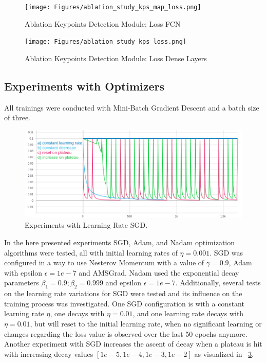 \begin{figure}[H]
    \centering
    \texttt{[image: Figures/ablation\_study\_kps\_map\_loss.png]}
    \decoRule
    \caption[Ablation Keypoints Detection Module: Loss FCN]{Ablation Keypoints Detection Module: Loss FCN}
    \label{fig:kps-map-loss}
\end{figure}


\begin{figure}[H]
    \centering
    \texttt{[image: Figures/ablation\_study\_kps\_loss.png]}
    \decoRule
    \caption[Ablation Keypoints Detection Module: Loss Dense Layers]{Ablation Keypoints Detection Module: Loss Dense Layers}
    \label{fig:kps-loss}
\end{figure}





\subsection{Experiments with Optimizers}
All trainings were conducted with Mini-Batch Gradient Descent and a batch size of three.

\begin{figure}[H]
    \centering
    \includegraphics[width=\textwidth,height=\textheight,keepaspectratio]{img/learning_rate2.png}
    \decoRule
    \caption[Experiments: Learning Rate SGD]{Experiments with Learning Rate SGD.}
    \label{fig:sgd-learning-rate}
\end{figure}
In the here presented experiments \gls{SGD}, \gls{Adam}, and \gls{Nadam} optimization algorithms were tested, all with initial learning rates of $\eta=0.001$.
\gls{SGD} was configured in a way to use Nesterov Momentum with a value of $\gamma=0.9$, \gls{Adam} with epsilon $\epsilon=1e-7$ and AMSGrad.
Nadam used the exponential decay parameters $\beta_1=0.9; \beta_2=0.999$ and epsilon $\epsilon=1e-7$.
Additionally, several tests on the learning rate variations for \gls{SGD} were tested and its influence on the training process was investigated.
One \gls{SGD} configuration is with a constant learning rate $\eta$, one decays with $\eta=0.01$, and one learning rate
decays with $\eta=0.01$, but will reset to the initial learning rate, when no significant learning or changes regarding
the loss value is observed over the last 50 epochs anymore.
Another experiment with \gls{SGD} increases the ascent of decay when a plateau is hit with increasing decay values
$[1e-5, 1e-4, 1e-3, 1e-2]$ as visualized in ~\ref{fig:sgd-learning-rate}.



